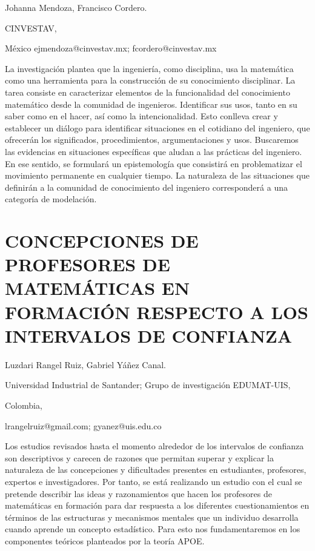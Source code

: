 \begin{datos}

Johanna Mendoza, Francisco Cordero.

CINVESTAV,

México ejmendoza@cinvestav.mx; fcordero@cinvestav.mx 

\end{datos}

La investigación plantea que la ingeniería, como disciplina, usa la
matemática como una herramienta para la construcción de su conocimiento
disciplinar. La tarea consiste en caracterizar elementos de la funcionalidad
del conocimiento matemático desde la comunidad de ingenieros. Identificar
sus usos, tanto en su saber como en el hacer, así como la intencionalidad.
Esto conlleva crear y establecer un diálogo para identificar situaciones
en el cotidiano del ingeniero, que ofrecerán los significados, procedimientos,
argumentaciones y usos. Buscaremos las evidencias en situaciones específicas
que aludan a las prácticas del ingeniero. En ese sentido, se formulará
un epistemología que consistirá en problematizar el movimiento permanente
en cualquier tiempo. La naturaleza de las situaciones que definirán
a la comunidad de conocimiento del ingeniero corresponderá a una categoría
de modelación.


\section{CONCEPCIONES DE PROFESORES DE MATEMÁTICAS EN FORMACIÓN RESPECTO A
LOS INTERVALOS DE CONFIANZA }

\begin{datos}

Luzdari Rangel Ruiz, Gabriel Yáñez Canal.

Universidad Industrial de Santander; Grupo de investigación EDUMAT-UIS,

Colombia,

lrangelruiz@gmail.com; gyanez@uis.edu.co

\end{datos}

Los estudios revisados hasta el momento alrededor de los intervalos
de confianza son descriptivos y carecen de razones que permitan superar
y explicar la naturaleza de las concepciones y dificultades presentes
en estudiantes, profesores, expertos e investigadores. Por tanto,
se está realizando un estudio con el cual se pretende describir las
ideas y razonamientos que hacen los profesores de matemáticas en formación
para dar respuesta a los diferentes cuestionamientos en términos de
las estructuras y mecanismos mentales que un individuo desarrolla
cuando aprende un concepto estadístico. Para esto nos fundamentaremos
en los componentes teóricos planteados por la teoría APOE.


